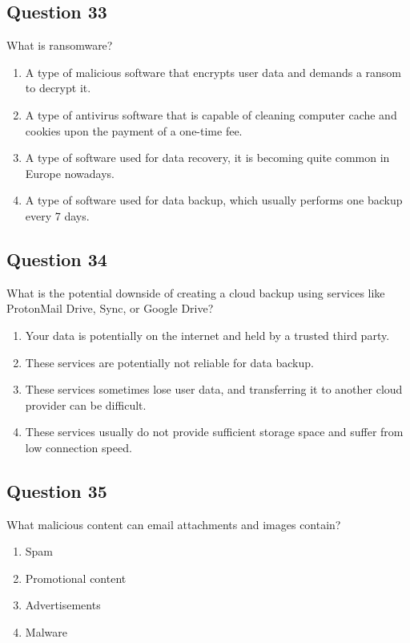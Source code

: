 \documentclass[12pt,a4paper]{article}
\begin{document}
\bigskip


\subsection*{Question 33}
What is ransomware?

\begin{enumerate}[label=\Alph*., leftmargin=*]
\item A type of malicious software that encrypts user data and demands a ransom to decrypt it.
\item A type of antivirus software that is capable of cleaning computer cache and cookies upon the payment of a one-time fee.
\item A type of software used for data recovery, it is becoming quite common in Europe nowadays.
\item A type of software used for data backup, which usually performs one backup every 7 days.
\end{enumerate}

\bigskip


\subsection*{Question 34}
What is the potential downside of creating a cloud backup using services like ProtonMail Drive, Sync, or Google Drive?

\begin{enumerate}[label=\Alph*., leftmargin=*]
\item Your data is potentially on the internet and held by a trusted third party.
\item These services are potentially not reliable for data backup.
\item These services sometimes lose user data, and transferring it to another cloud provider can be difficult.
\item These services usually do not provide sufficient storage space and suffer from low connection speed.
\end{enumerate}

\bigskip


\subsection*{Question 35}
What malicious content can email attachments and images contain?

\begin{enumerate}[label=\Alph*., leftmargin=*]
\item Spam
\item Promotional content
\item Advertisements
\item Malware
\end{enumerate}
\end{document}
